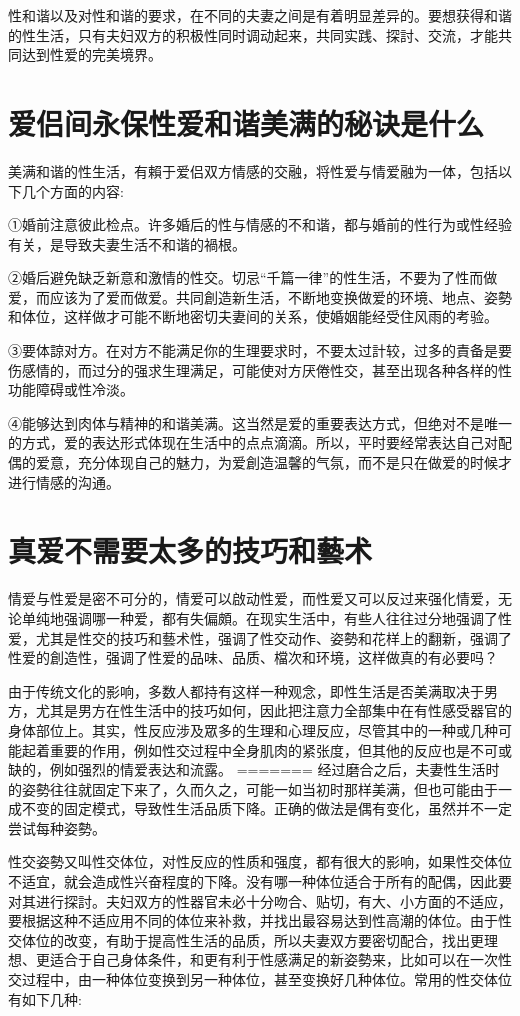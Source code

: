 \documentclass[12pt,UTF8]{ctexbook}
\begin{document}
性和谐以及对性和谐的要求，在不同的夫妻之间是有着明显差异的。要想获得和谐的性生活，只有夫妇双方的积极性同时调动起来，共同实践、探討、交流，才能共同达到性爱的完美境界。

\section{爱侣间永保性爱和谐美满的秘诀是什么}

美满和谐的性生活，有賴于爱侣双方情感的交融，将性爱与情爱融为一体，包括以下几个方面的内容:

①婚前注意彼此检点。许多婚后的性与情感的不和谐，都与婚前的性行为或性经验有关，是导致夫妻生活不和谐的禍根。

②婚后避免缺乏新意和激情的性交。切忌“千篇一律”的性生活，不要为了性而做爱，而应该为了爱而做爱。共同創造新生活，不断地变换做爱的环境、地点、姿勢和体位，这样做才可能不断地密切夫妻间的关系，使婚姻能经受住风雨的考验。

③要体諒对方。在对方不能满足你的生理要求时，不要太过計较，过多的責备是要伤感情的，而过分的强求生理满足，可能使对方厌倦性交，甚至出现各种各样的性功能障碍或性冷淡。

④能够达到肉体与精神的和谐美满。这当然是爱的重要表达方式，但绝对不是唯一的方式，爱的表达形式体现在生活中的点点滴滴。所以，平时要经常表达自己对配偶的爱意，充分体现自己的魅力，为爱創造温馨的气氛，而不是只在做爱的时候才进行情感的沟通。

\section{真爱不需要太多的技巧和藝术}

情爱与性爱是密不可分的，情爱可以啟动性爱，而性爱又可以反过来强化情爱，无论单纯地强调哪一种爱，都有失偏頗。在现实生活中，有些人往往过分地强调了性爱，尤其是性交的技巧和藝术性，强调了性交动作、姿勢和花样上的翻新，强调了性爱的創造性，强调了性爱的品味、品质、檔次和环境，这样做真的有必要吗？

由于传统文化的影响，多数人都持有这样一种观念，即性生活是否美满取决于男方，尤其是男方在性生活中的技巧如何，因此把注意力全部集中在有性感受器官的身体部位上。其实，性反应涉及眾多的生理和心理反应，尽管其中的一种或几种可能起着重要的作用，例如性交过程中全身肌肉的紧张度，但其他的反应也是不可或缺的，例如强烈的情爱表达和流露。
=======
经过磨合之后，夫妻性生活时的姿勢往往就固定下来了，久而久之，可能一如当初时那样美满，但也可能由于一成不变的固定模式，导致性生活品质下降。正确的做法是偶有变化，虽然并不一定尝试每种姿勢。

性交姿勢又叫性交体位，对性反应的性质和强度，都有很大的影响，如果性交体位不适宜，就会造成性兴奋程度的下降。没有哪一种体位适合于所有的配偶，因此要对其进行探討。夫妇双方的性器官未必十分吻合、贴切，有大、小方面的不适应，要根据这种不适应用不同的体位来补救，并找出最容易达到性高潮的体位。由于性交体位的改变，有助于提高性生活的品质，所以夫妻双方要密切配合，找出更理想、更适合于自己身体条件，和更有利于性感满足的新姿勢来，比如可以在一次性交过程中，由一种体位变换到另一种体位，甚至变换好几种体位。常用的性交体位有如下几种:
\end{document}
